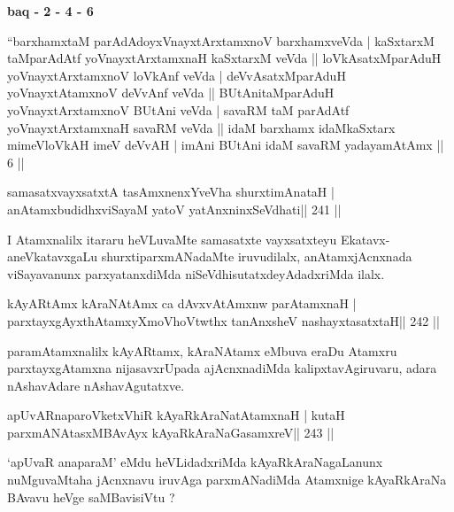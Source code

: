 \begin{center}
{\large\textbf{baq - 2 - 4 - 6}}
\end{center}

\begin{shl}
``barxhamxtaM parAdAdoyxVnayxtArxtamxnoV barxhamxveVda |
kaSxtarxM taMparAdAtf yoV\s nayxtArxtamxnaH kaSxtarxM veVda ||
loVkAsatxMparAduH yoV\s nayxtArxtamxnoV loVkAnf veVda |
deVvAsatxMparAduH yoV\s nayxtAtamxnoV deVvAnf veVda ||
BUtAnitaMparAduH yoV\s nayxtArxtamxnoV BUtAni veVda |
savaRM taM parAdAtf yoV\s nayxtArxtamxnaH savaRM veVda ||
idaM barxhamx idaMkaSxtarx mimeVloVkAH imeV deVvAH |
imAni BUtAni idaM savaRM yadayamAtAmx || 6 ||
\end{shl}


\begin{shl}
samasatxvayxsatxtA tasAmxnenxYveVha shurxtimAnataH |
anAtamxbudidhxviSayaM yatoV yatAnxninxSeVdhati\hfill || 241 ||
\end{shl}

\begin{artha}
I Atamxnalilx itararu heVLuvaMte samasatxte vayxsatxteyu Ekatavx-aneVkatavxgaLu shurxtiparxmANadaMte iruvudilalx, anAtamxjAcnxnada viSayavanunx parxyatanxdiMda niSeVdhisutatxdeyAdadxriMda ilalx.
\end{artha}

\begin{shl}
kAyARtAmx kAraNAtAmx ca dAvxvAtAmxnw parAtamxnaH |
parxtayxgAyxthAtamxyXmoVhoVtwthx tanAnxsheV nashayxtasatxtaH\hfill || 242 ||
\end{shl}

\begin{artha}
paramAtamxnalilx kAyARtamx, kAraNAtamx eMbuva eraDu Atamxru parxtayxgAtamxna nijasavxrUpada ajAcnxnadiMda kalipxtavAgiruvaru, adara nAshavAdare nAshavAgutatxve.
\end{artha}

\begin{shl}
apUvARnaparoVketxVhiR kAyaRkAraNatA\s\s tamxnaH |
kutaH parxmANAtasxMBAvAyx kAyaRkAraNaGasamxreV\hfill || 243 ||
\end{shl}

\begin{artha}
`apUvaR anaparaM' eMdu heVLidadxriMda kAyaRkAraNagaLanunx nuMgu\-vaMtaha jAcnxnavu iruvAga parxmANadiMda Atamxnige kAyaRkAraNa BAvavu heVge saMBavisiVtu ?
\end{artha}

